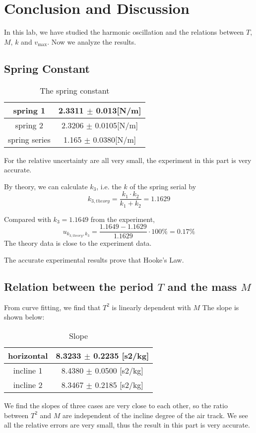 \section{Conclusion and Discussion}


In this lab, we have studied the harmonic oscillation 
and the relations between $T$, $M$, $k$ and $v_{\max}$. 
Now we analyze the results.


\subsection{Spring Constant}


\begin{table}[H]
\centering
\begin{tabular}{|c|c|}
spring 1 & 2.3311 $\pm$ 0.013[N/m] \\ \hline
spring 2 & 2.3206 $\pm$ 0.0105[N/m] \\ \hline
spring series & 1.165 $\pm$ 0.0380[N/m]  \\ \hline
\end{tabular}
\caption{The spring constant}
\end{table}


For the relative uncertainty are all very small,
the experiment in this part is very accurate.

By theory, we can calculate $k_3$, i.e. the $k$ of the spring serial by 
$$ k_{3,theory} = \frac{k_1 \cdot k_2 }{k_1 + k_2} =  1.1629 $$ 

Compared with $k_3 = 1.1649$  from the experiment,
$$ u_{k_{3,theory},k_3} = \frac{1.1649 - 1.1629}{1.1629} \cdot 100 \%  = 0.17 \% $$ 
The theory data is close to the experiment data.

The accurate experimental results prove that Hooke’s Law.



\subsection{Relation between the period $T$ and the mass $M$}

From curve fitting, we find that $T^2$  is linearly dependent with $M$
The slope is shown below:

\begin{table}[H]
\centering
\begin{tabular}{|c|c|}
horizontal  &  8.3233 $\pm$  0.2235 [s2/kg] \\ \hline
incline 1   &  8.4380 $\pm$  0.0500 [s2/kg] \\ \hline
incline 2   &  8.3467 $\pm$  0.2185 [s2/kg] \\ \hline
\end{tabular}
\caption{Slope}
\end{table}

We find the slopes of three cases are very close to each other, 
so the ratio between $T^2$ and $M$  are independent of the incline degree of the air track.
We see all the relative errors are very small,
thus the result in this part is very accurate.




